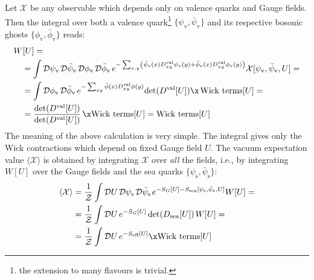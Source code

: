 \documentclass[english, LaM, oneside, noexaminfo]{sapthesis}
\newcommand{\la}{\langle}
\newcommand{\ra}{\rangle}
\begin{document}
Let $\mathcal{X}$ be any observable which depends only on valence quarks and Gauge fields.
Then the integral over both a valence quark\footnote{the extension to many flavours is trivial.} $\{\psi_\text{v},\bar\psi_\text{v}\}$ and its respective bosonic ghosts $\{\phi_\text{v}, \bar\phi_\text{v} \}$ reads:
\begin{equation*}
    \begin{aligned}
        & W[U] = \\ 
        & \quad = \int \mathcal{D}\psi_\text{v} \hspace*{0.5mm} \mathcal{D}\bar\psi_\text{v} \hspace*{0.5mm} \mathcal{D}\phi_\text{v} \hspace*{0.5mm} \mathcal{D}\bar\phi_\text{v} \hspace*{0.5mm} e^{-\sum_{x,y} \left( \bar\psi_\text{v} (x) D^\text{val}_{xy} \psi_\text{v} (y) + \bar\phi_\text{v} (x) D^\text{val}_{xy} \phi_\text{v} (y) \right)} \mathcal{X}[\psi_\text{v},\bar\psi_\text{v},U] = \\
        & \quad = \int \mathcal{D}\phi_\text{v} \hspace*{0.5mm} \mathcal{D}\bar\phi_\text{v} \hspace*{0.5mm} e^{- \sum_{xy} \bar\phi (x) D^\text{val}_{xy} \phi (y)} \text{det}(D^\text{val}[U]) \x \hspace*{.5mm} \text{Wick terms}[U] = \\
        & \quad = \frac{\text{det}(D^\text{val}[U])}{\text{det}(D^\text{val}[U])}\hspace*{.5mm} \x \text{Wick terms}[U] = \text{Wick terms}[U]
    \end{aligned}
\end{equation*}
The meaning of the above calculation is very simple. The integral gives only the Wick contractions which depend on fixed Gauge field $U$.
The vacuum expectation value $\la\mathcal{X}\ra$ is obtained by integrating $\mathcal{X}$ over {\it all} the fields, i.e., by integrating $W[U]$ over the Gauge fields and the sea quarks $\{\psi_\text{s},\bar\psi_\text{s}\}$:
\begin{equation*}
    \begin{aligned}
        \la \mathcal{X} \ra
        & = \frac{1}{\mathcal{Z}} \int \mathcal{D}U \hspace*{.5mm} \mathcal{D}\psi_\text{s} \hspace*{0.5mm} \mathcal{D}\bar\psi_\text{s} \hspace*{.5mm} e^{-S_G[U]-S_\text{sea}[\psi_\text{s},\bar\psi_\text{s},U]} W[U] = \\
        & = \frac{1}{\mathcal{Z}} \int \mathcal{D}U \hspace*{.5mm} e^{-S_G[U]} \hspace*{.5mm} \text{det}(D_\text{sea}[U]) \hspace*{.5mm} W[U]= \\
        & = \frac{1}{\mathcal{Z}} \int \mathcal{D}U \hspace*{.5mm} e^{-S_\text{eff}[U]} \x \text{Wick terms}[U]
    \end{aligned}
\end{equation*}
\end{document}
